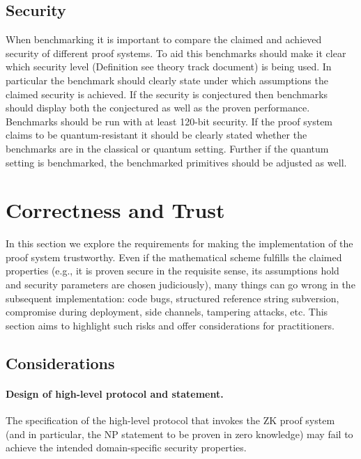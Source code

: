 \subsection{Security}
When benchmarking it is important to compare the claimed and achieved security of different proof systems. To aid this benchmarks should make it clear which security level (Definition see theory track document) is being used. 
In particular the benchmark should clearly state under which assumptions the claimed security is achieved. 
If the security is conjectured then benchmarks should display both the conjectured as well as the proven performance. 
Benchmarks should be run with at least 120-bit security. 
If the proof system claims to be quantum-resistant it should be clearly stated whether the benchmarks are in the classical or quantum setting. 
Further if the quantum setting is benchmarked, the benchmarked primitives should be adjusted as well.


\section{Correctness and Trust}

In this section we explore the requirements for making the implementation of the proof system trustworthy. Even if the mathematical scheme fulfills the claimed properties (e.g., it is proven secure in the requisite sense, its assumptions hold and security parameters are chosen judiciously), many things can go wrong in the subsequent implementation: code bugs, structured reference string subversion, compromise during deployment, side channels, tampering attacks, etc. This section aims to highlight such risks and offer considerations for practitioners.


\subsection{Considerations}


\paragraph{Design of high-level protocol and statement.}

The specification of the high-level protocol that invokes the ZK proof system (and in particular, the NP statement to be proven in zero knowledge) may fail to achieve the intended domain-specific security properties.

